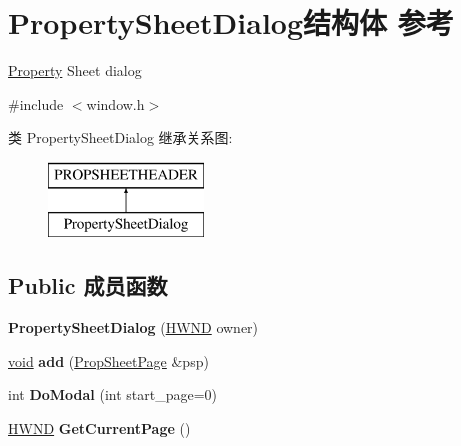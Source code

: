 \hypertarget{struct_property_sheet_dialog}{}\section{Property\+Sheet\+Dialog结构体 参考}
\label{struct_property_sheet_dialog}


\hyperlink{struct_property}{Property} Sheet dialog  




{\ttfamily \#include $<$window.\+h$>$}

类 Property\+Sheet\+Dialog 继承关系图\+:\begin{figure}[H]
\begin{center}
\leavevmode
\includegraphics[height=2.000000cm]{struct_property_sheet_dialog}
\end{center}
\end{figure}
\subsection*{Public 成员函数}
\begin{DoxyCompactItemize}
\item 
\mbox{\label{struct_property_sheet_dialog_a69750ba15222b241b554f0a2c7e6cea0}} 
{\bfseries Property\+Sheet\+Dialog} (\hyperlink{interfacevoid}{H\+W\+ND} owner)
\item 
\mbox{\label{struct_property_sheet_dialog_a5f76087dbb43c196f4a56bccdae3ebda}} 
\hyperlink{interfacevoid}{void} {\bfseries add} (\hyperlink{struct_prop_sheet_page}{Prop\+Sheet\+Page} \&psp)
\item 
\mbox{\label{struct_property_sheet_dialog_a3ec4377a9bef800002f0856596e89347}} 
int {\bfseries Do\+Modal} (int start\+\_\+page=0)
\item 
\mbox{\label{struct_property_sheet_dialog_a67604e972cb258b4ab0864d31a08b8e8}} 
\hyperlink{interfacevoid}{H\+W\+ND} {\bfseries Get\+Current\+Page} ()
\end{DoxyCompactItemize}
